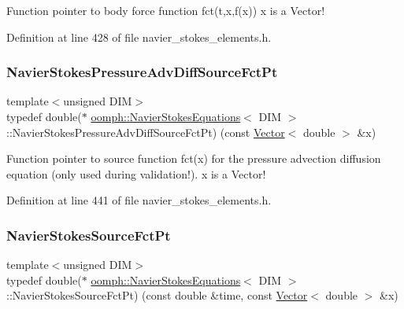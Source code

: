 Function pointer to body force function fct(t,x,f(x)) x is a Vector! 



Definition at line 428 of file navier\+\_\+stokes\+\_\+elements.\+h.

\mbox{\label{classoomph_1_1NavierStokesEquations_ae97e12328a88431038ccb321ee6d0c73}} 
\subsubsection{\texorpdfstring{Navier\+Stokes\+Pressure\+Adv\+Diff\+Source\+Fct\+Pt}{NavierStokesPressureAdvDiffSourceFctPt}}
{\footnotesize\ttfamily template$<$unsigned D\+IM$>$ \\
typedef double($\ast$ \hyperlink{classoomph_1_1NavierStokesEquations}{oomph\+::\+Navier\+Stokes\+Equations}$<$ D\+IM $>$\+::Navier\+Stokes\+Pressure\+Adv\+Diff\+Source\+Fct\+Pt) (const \hyperlink{classoomph_1_1Vector}{Vector}$<$ double $>$ \&x)}



Function pointer to source function fct(x) for the pressure advection diffusion equation (only used during validation!). x is a Vector! 



Definition at line 441 of file navier\+\_\+stokes\+\_\+elements.\+h.

\mbox{\label{classoomph_1_1NavierStokesEquations_a1d69b671e6d4c0e75a02d6fa3dab478f}} 
\subsubsection{\texorpdfstring{Navier\+Stokes\+Source\+Fct\+Pt}{NavierStokesSourceFctPt}}
{\footnotesize\ttfamily template$<$unsigned D\+IM$>$ \\
typedef double($\ast$ \hyperlink{classoomph_1_1NavierStokesEquations}{oomph\+::\+Navier\+Stokes\+Equations}$<$ D\+IM $>$\+::Navier\+Stokes\+Source\+Fct\+Pt) (const double \&time, const \hyperlink{classoomph_1_1Vector}{Vector}$<$ double $>$ \&x)}



